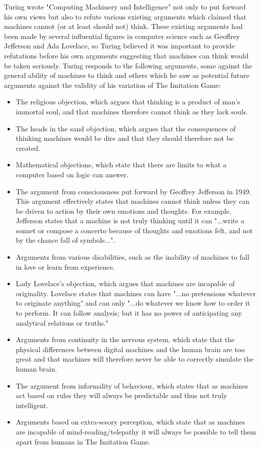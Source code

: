 \documentclass{article}
\begin{document}
Turing wrote "Computing Machinery and Intelligence" not only to put forward his own views but also to refute various existing arguments which claimed that machines cannot (or at least should not) think. These existing arguments had been made by several influential figures in computer science such as Geoffrey Jefferson and Ada Lovelace, so Turing believed it was important to provide refutations before his own arguments suggesting that machines can think would be taken seriously.
\break
\break
Turing responds to the following arguments, some against the general ability of machines to think and others which he saw as potential future arguments against the validity of his variation of The Imitation Game:
\begin{itemize}
\item The religious objection, which argues that thinking is a product of man's immortal soul, and that machines therefore cannot think as they lack souls.
\item The heads in the sand objection, which argues that the consequences of thinking machines would be dire and that they should therefore not be created.
\item Mathematical objections, which state that there are limits to what a computer based on logic can answer.
\item The argument from consciousness put forward by Geoffrey Jefferson in 1949. This argument effectively states that machines cannot think unless they can be driven to action by their own emotions and thoughts. For example, Jefferson states that a machine is not truly thinking until it can "...write a sonnet or compose a concerto because of thoughts and emotions felt, and not by the chance fall of symbols...".\cite{jefferson1949_BMJ}
\item Arguments from various disabilities, such as the inability of machines to fall in love or learn from experience.
\item Lady Lovelace's objection, which argues that machines are incapable of originality. Lovelace states that machines can have "...no pretensions whatever to originate anything" and can only "...do whatever we know how to order it to perform. It can follow analysis; but it has no power of anticipating any analytical relations or truths."\cite{lovelace1843_notes}
\item Arguments from continuity in the nervous system, which state that the physical differences between digital machines and the human brain are too great and that machines will therefore never be able to correctly simulate the human brain.
\item The argument from informality of behaviour, which states that as machines act based on rules they will always be predictable and thus not truly intelligent.
\item Arguments based on extra-sesory perception, which state that as machines are incapable of mind-reading/telepathy it will always be possible to tell them apart from humans in The Imitation Game.
\end{itemize}
\end{document}
